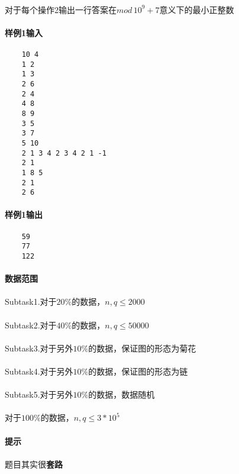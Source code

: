 \documentclass[UTF8]{ctexart}
\begin{document}
\paragraph{}对于每个操作2输出一行答案在$mod$$\,{10^9+7}$意义下的最小正整数
\paragraph{样例1输入}
\begin{lstlisting}
    10 4
    1 2
    1 3
    2 6
    2 4
    4 8
    8 9
    3 5
    3 7
    5 10
    2 1 3 4 2 3 4 2 1 -1
    2 1
    1 8 5
    2 1
    2 6
\end{lstlisting}
\paragraph{样例1输出}
\begin{lstlisting}
    59
    77
    122
\end{lstlisting}
\paragraph{数据范围}
\paragraph{}Subtask1.对于$20\%$的数据，$n,q\leq 2000$
\paragraph{}Subtask2.对于$40\%$的数据，$n,q\leq 50000$
\paragraph{}Subtask3.对于另外$10\%$的数据，保证图的形态为菊花
\paragraph{}Subtask4.对于另外$10\%$的数据，保证图的形态为链
\paragraph{}Subtask5.对于另外$10\%$的数据，数据随机
\paragraph{}对于$100\%$的数据，$n,q\leq 3*10^5$
\paragraph{提示}
\paragraph{}题目其实很\textbf{套路}
\end{document}
